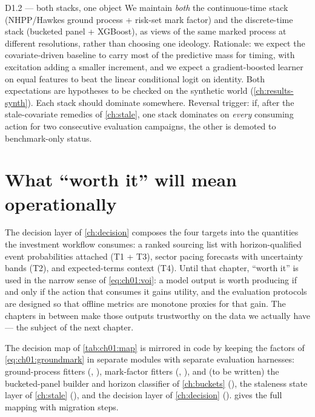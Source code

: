 \begin{decision}{D1.2 --- both stacks, one object}
We maintain \emph{both} the continuous-time stack (NHPP/Hawkes ground
process + risk-set mark factor) and the discrete-time stack (bucketed
panel + XGBoost), as views of the same marked process at different
resolutions, rather than choosing one ideology. Rationale: we expect the
covariate-driven baseline to carry most of the predictive mass for timing,
with excitation adding a smaller increment, and we expect a
gradient-boosted learner on equal features to beat the linear conditional
logit on identity. Both expectations are hypotheses to be checked on the
synthetic world (\cref{ch:results-synth}). Each stack should dominate
somewhere. Reversal trigger: if, after the stale-covariate
remedies of \cref{ch:stale}, one stack dominates on \emph{every} consuming
action for two consecutive evaluation campaigns, the other is demoted to
benchmark-only status.
\end{decision}

\section{What ``worth it'' will mean operationally}\label{ch01:sec:operational}

The decision layer of \cref{ch:decision} composes the four targets into
the quantities the investment workflow consumes: a ranked sourcing list
with horizon-qualified event probabilities attached (T1 + T3), sector
pacing forecasts with uncertainty bands (T2), and expected-terms context
(T4). Until that chapter, ``worth it'' is used in the narrow sense of
\cref{eq:ch01:voi}: a model output is worth producing if and only if the
action that consumes it gains utility, and the evaluation protocols are
designed so that offline metrics are monotone proxies for that gain. The
chapters in between make those outputs trustworthy on the data we actually
have --- the subject of the next chapter.

\begin{codehooks}
The decision map of \cref{tab:ch01:map} is mirrored in code by keeping the
factors of \cref{eq:ch01:groundmark} in separate modules with separate
evaluation harnesses: ground-process fitters (,
), mark-factor fitters (,
), and (to be written) the bucketed-panel
builder and horizon classifier of \cref{ch:buckets}
(), the staleness state layer of \cref{ch:stale}
(), and the decision layer of \cref{ch:decision}
().  gives the full mapping with
migration steps.
\end{codehooks}
